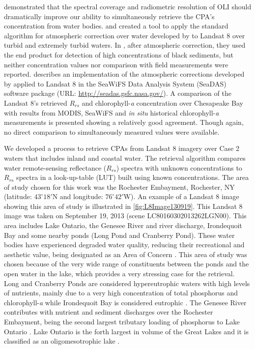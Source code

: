 \documentclass[onecolumn,3p,letterpaper]{elsarticle}
\begin{document}
\cite*{Gerace:2013} demonstrated that the spectral coverage and radiometric resolution of OLI should dramatically improve our ability to simultaneously retrieve the CPA's concentration from water bodies. \cite{Vanhellemont2014} and \cite{Vanhellemont:2015} created a tool to apply the standard algorithm for atmospheric correction over water developed by \cite{Gordon:1994} to Landsat 8 over turbid and extremely turbid waters. In \cite{Vanhellemont:2015}, after atmospheric correction, they used the end product for detection of high concentrations of black sediments, but neither concentration values nor comparison with field measurements were reported. \cite{Franz:2015} describes an implementation of the atmospheric corrections developed by \cite{Gordon:1994} applied to Landsat 8 in the SeaWiFS Data Analysis System (SeaDAS) software package (URL: \url{http://seadas.gsfc.nasa.gov/}). A comparison of the Landsat 8's retrieved $R_{rs}$ and chlorophyll-{\it a} concentration over Chesapeake Bay with results from MODIS, SeaWiFS and {\it in situ} historical chlorophyll-{\it a} measurements is presented showing a relatively good agreement. Though again, no direct comparison to simultaneously measured values were available.


We developed a process to retrieve CPAs from Landsat 8 imagery over Case 2 waters that includes inland and coastal water. The retrieval algorithm compares water remote-sensing reflectance ($R_{rs}$) spectra with unknown concentrations to $R_{rs}$ spectra in a look-up-table (LUT) built using known concentrations. The area of study chosen for this work was the Rochester Embayment, Rochester, NY (latitude: $43^\circ18'$N and longitude: $76^\circ42'$W). An example of a Landsat 8 image showing this area of study is illustrated in \autoref{fig:L8Image130919}. This Landsat 8 image was taken on September 19, 2013 (scene LC80160302013262LGN00). This area includes Lake Ontario, the Genesee River and river discharge, Irondequoit Bay and some nearby ponds (Long Pond and Cranberry Pond). These water bodies have experienced degraded water quality, reducing their recreational and aesthetic value, being designated as an Area of Concern \citep{Makarewicz2010}. This area of study was chosen because of the very wide range of constituents between the ponds and the open water in the lake, which provides a very stressing case for the retrieval. Long and Cranberry Ponds are considered hypereutrophic waters with high levels of nutrients, mainly due to a very high concentration of total phosphorus and chlorophyll-{\it a} \citep{NYSDEC2010,Makarewicz1994} while Irondequoit Bay is considered eutrophic \citep{Makarewicz2010}. The Genesee River contributes with nutrient and sediment discharges over the Rochester Embayment, being the second largest tributary loading of phosphorus to Lake Ontario \citep{NYSDEC2015}. Lake Ontario is the forth largest in volume of the Great Lakes and it is classified as an oligomesotrophic lake \citep{IJC1980}. 
\end{document}
